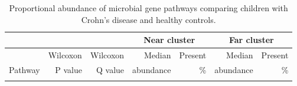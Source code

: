 \newpage
{\footnotesize
	\renewcommand{\arraystretch}{0.8} \setlength{\tabcolsep}{1pt}
	\begin{longtable}{ | l | r | r | r | r | r | r  | }
		\caption[Proportional abundance of microbial gene pathways comparing children with Crohn’s disease and healthy controls.]{Proportional abundance of microbial gene pathways comparing children with Crohn’s disease and healthy controls.} 
		\label{TS4} \\
		
		\hline
		\multicolumn{3}{|c|}{} & \multicolumn{2}{c}{Near cluster}
		& \multicolumn{2}{|c|}{Far cluster}\\
		\hline 
		& Wilcoxon & Wilcoxon & Median& Present & Median &  Present\\ 
		Pathway & P value & Q value & abundance & \% & abundance & \% \\ 
		\hline 
		\endfirsthead
		
		
		\endfoot
		
		\hline 
		\endlastfoot
		
		
		

\end{longtable}}
